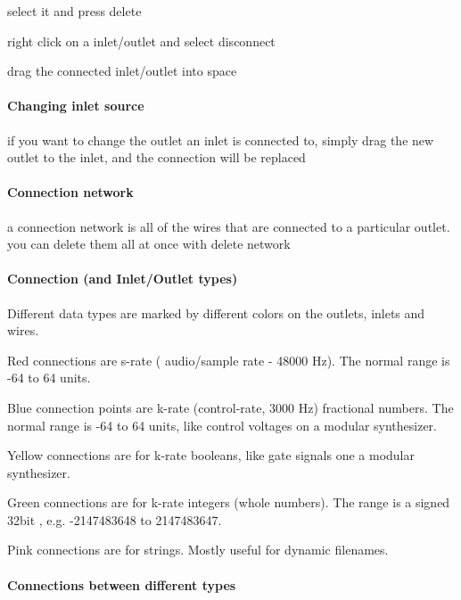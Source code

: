 \begin{DoxyItemize}
\item select it and press delete  
\item right click on a inlet/outlet and select disconnect 
\item drag the connected inlet/outlet into space 
\end{DoxyItemize}\hypertarget{axo_gui_axo_gui_axoloti_edit_mode_connections_change_inlet_source}{}\paragraph{Changing inlet source}\label{axo_gui_axo_gui_axoloti_edit_mode_connections_change_inlet_source}
if you want to change the outlet an inlet is connected to, simply drag the new outlet to the inlet, and the connection will be replaced\hypertarget{axo_gui_axo_gui_axoloti_edit_mode_connections_network}{}\paragraph{Connection network}\label{axo_gui_axo_gui_axoloti_edit_mode_connections_network}
a connection network is all of the wires that are connected to a particular outlet. you can delete them all at once with delete network\hypertarget{axo_gui_axo_gui_axoloti_edit_mode_connections_types}{}\paragraph{Connection (and Inlet/\+Outlet types)}\label{axo_gui_axo_gui_axoloti_edit_mode_connections_types}
Different data types are marked by different colors on the outlets, inlets and wires.


\begin{DoxyItemize}
\item Red connections are s-\/rate ( audio/sample rate -\/ 48000 Hz). The normal range is -\/64 to 64 units. 
\item Blue connection points are k-\/rate (control-\/rate, 3000 Hz) fractional numbers. The normal range is -\/64 to 64 units, like control voltages on a modular synthesizer. 
\item Yellow connections are for k-\/rate booleans, like gate signals one a modular synthesizer. 
\item Green connections are for k-\/rate integers (whole numbers). The range is a signed 32bit , e.\+g. -\/2147483648 to 2147483647.  
\item Pink connections are for strings. Mostly useful for dynamic filenames. 
\end{DoxyItemize}\hypertarget{axo_gui_axo_gui_axoloti_edit_mode_connections_different_types}{}\paragraph{Connections between different types}\label{axo_gui_axo_gui_axoloti_edit_mode_connections_different_types}


